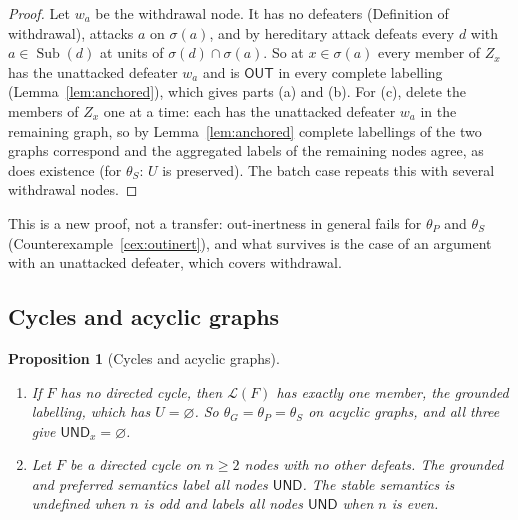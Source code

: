 \documentclass[11pt]{article}
\theoremstyle{plain}
\newtheorem{proposition}[theorem]{Proposition}
\theoremstyle{definition}
\theoremstyle{remark}
\newcommand{\OUT}{\textsf{OUT}}
\newcommand{\UND}{\textsf{UND}}
\newcommand{\Sub}{\operatorname{Sub}}
\begin{document}
\begin{proof}
Let $w_a$ be the withdrawal node. It has no defeaters (Definition of withdrawal), attacks $a$ on $\sigma(a)$, and by hereditary attack defeats every $d$ with $a\in\Sub(d)$ at units of $\sigma(d)\cap\sigma(a)$. So at $x\in\sigma(a)$ every member of $Z_x$ has the unattacked defeater $w_a$ and is $\OUT$ in every complete labelling (Lemma~\ref{lem:anchored}), which gives parts (a) and (b). For (c), delete the members of $Z_x$ one at a time: each has the unattacked defeater $w_a$ in the remaining graph, so by Lemma~\ref{lem:anchored} complete labellings of the two graphs correspond and the aggregated labels of the remaining nodes agree, as does existence (for $\theta_S$: $U$ is preserved). The batch case repeats this with several withdrawal nodes. \qedhere
\end{proof}

This is a new proof, not a transfer: out-inertness in general fails for $\theta_P$ and $\theta_S$ (Counterexample~\ref{cex:outinert}), and what survives is the case of an argument with an unattacked defeater, which covers withdrawal.

\subsection{Cycles and acyclic graphs}

\begin{proposition}[Cycles and acyclic graphs]\label{prop:cycles}
\begin{enumerate}[label=(\alph*)]
\item If $F$ has no directed cycle, then $\mathcal L(F)$ has exactly one member, the grounded labelling, which has $U=\varnothing$. So $\theta_G=\theta_P=\theta_S$ on acyclic graphs, and all three give $\UND_x=\varnothing$.
\item Let $F$ be a directed cycle on $n\ge2$ nodes with no other defeats. The grounded and preferred semantics label all nodes $\UND$. The stable semantics is undefined when $n$ is odd and labels all nodes $\UND$ when $n$ is even.
\end{enumerate}
\end{proposition}
\end{document}
